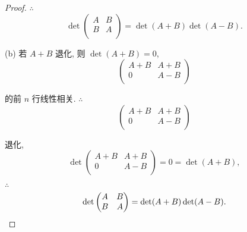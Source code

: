 \documentclass{ctexart}
\begin{document}
\begin{proof}
    $\therefore$
    \[\det\begin{pmatrix}
        A & B \\
        B & A \\
    \end{pmatrix}=\det(A+B)\det(A-B).\]

    (b) 若 $A+B$ 退化, 则 $\det(A+B)=0$,
    \[\begin{pmatrix}
        A+B & A+B \\
        0 & A-B \\
    \end{pmatrix}\]

    的前 $n$ 行线性相关. $\therefore$
    \[\begin{pmatrix}
        A+B & A+B \\
        0 & A-B \\
    \end{pmatrix}\]

    退化,
    \[\det\begin{pmatrix}
        A+B & A+B \\
        0 & A-B \\
    \end{pmatrix}=0=\det(A+B),\]

    $\therefore$
    \[\det\begin{pmatrix}
        A & B \\
        B & A \\
    \end{pmatrix}=\det(A+B)\det(A-B).\qedhere\]
\end{proof}
\end{document}
